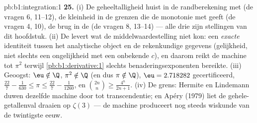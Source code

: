 \begin{solution}{pb:b1:integration:1}
\textbf{25.} (i) De geheeltalligheid huist in de randberekening
met  (de vragen 6, 11--12), de kleinheid in de grenzen
die de monotonie met  geeft (de vragen 4, 10), de brug in
de  (de vragen 8, 13--14) --- alle drie zijn
stellingen van dit hoofdstuk. (ii) De  levert wat de
middelwaardestelling niet kon: een \emph{exacte} identiteit
tussen het analytische object en de rekenkundige gegevens
(gelijkheid, niet slechts een ongelijkheid met een onbekende
$c$), en daarom reikt de machine tot $\pi^2$ terwijl
\cref{pb:b1:derivative:1} slechts benaderingsexponenten
bereikte. (iii) Geoogst: $\eu \notin \Q$, $\pi^2 \notin \Q$ (en
dus $\pi \notin \Q$), $\eu = 2.718282$ gecertificeerd,
$\frac{22}{7} - \frac{1}{630} \leq \pi \leq \frac{22}{7} -
\frac{1}{1260}$, en $\binom{2n}{n} \geq \frac{4^n}{2n+1}$. (iv)
De grens: Hermite en Lindemann duwen dezelfde machine door tot
transcendentie; en Apéry (1979) liet de gehele-getallenval
draaien op $\zeta(3)$ --- de machine produceert nog steeds
wiskunde van de twintigste eeuw.
\end{solution}
